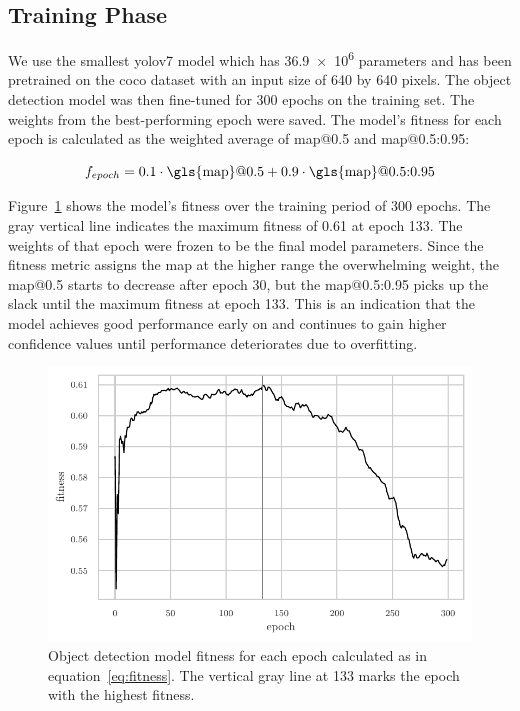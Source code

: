 \documentclass[draft,final]{vutinfth} %
\begin{document}
\subsection{Training Phase}
\label{ssec:obj-training-phase}

We use the smallest \gls{yolo}v7 model which has \num{36.9e6}
parameters \cite{wang2022} and has been pretrained on the \gls{coco}
dataset \cite{lin2015} with an input size of \num{640} by \num{640}
pixels. The object detection model was then fine-tuned for \num{300}
epochs on the training set. The weights from the best-performing epoch
were saved. The model's fitness for each epoch is calculated as the
weighted average of \gls{map}@0.5 and \gls{map}@0.5:0.95:

\begin{equation}
  \label{eq:fitness}
  f_{epoch} = 0.1 \cdot \mathrm{\gls{map}}@0.5 + 0.9 \cdot \mathrm{\gls{map}}@0.5\mathrm{:}0.95
\end{equation}

Figure~\ref{fig:fitness} shows the model's fitness over the training
period of \num{300} epochs. The gray vertical line indicates the
maximum fitness of \num{0.61} at epoch \num{133}. The weights of that
epoch were frozen to be the final model parameters. Since the fitness
metric assigns the \gls{map} at the higher range the overwhelming
weight, the \gls{map}@0.5 starts to decrease after epoch \num{30}, but
the \gls{map}@0.5:0.95 picks up the slack until the maximum fitness at
epoch \num{133}. This is an indication that the model achieves good
performance early on and continues to gain higher confidence values
until performance deteriorates due to overfitting.

\begin{figure}
  \centering
  \includegraphics{graphics/model_fitness.pdf}
  \caption[Object detection fitness per epoch.]{Object detection model
    fitness for each epoch calculated as in
    equation~\ref{eq:fitness}. The vertical gray line at \num{133}
    marks the epoch with the highest fitness.}
  \label{fig:fitness}
\end{figure}
\end{document}
